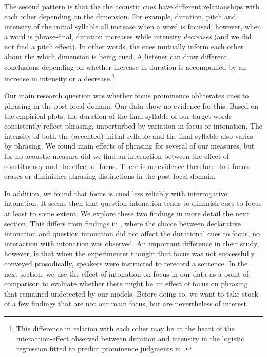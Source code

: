 \documentclass[preprint,review,12pt,authoryear,times]{elsarticle}
\begin{document}
The second pattern is that the the acoustic cues have different relationships with each other depending on the dimension. For example, duration, pitch and intensity of the initial syllable all increase when a word is focused; however, when a word  is phrase-final, duration increases while intensity {\em decreases} (and we did not find a pitch effect). In other words, the cues mutually inform each other about the which dimension is being cued. A listener can draw different conclusions depending on whether increase in duration is accompanied by an increase in intensity or a decrease.\footnote{This difference in relation with each other may be at the heart of the interaction-effect observed between duration and intensity in the logistic regression fitted to predict prominence judgments in \citet{bisho19}.}

Our main research question was whether focus prominence obliterates cues to phrasing in the post-focal domain. Our data show no evidence for this. Based on the empirical plots, the duration of the final syllable of our target words consistently reflect phrasing, unperturbed by variation in focus or intonation. The intensity of both the (accented) initial syllable and the final syllable also varies by phrasing. We found main effects of phrasing for several of our measures, but for no acoustic measure did we find an interaction between the effect of constituency and the effect of focus. There is no evidence therefore that focus erases or diminishes phrasing distinctions in the post-focal domain. 

In addition, we found that focus is cued less reliably with interrogative intonation. It seems then that question intonation tends to diminish cues to focus at least to some extent.  We explore these two findings in more detail the next section. This differs from findings in \citet{eady86}, where the choice between declarative intonation and question intonation did not affect the durational cues to focus, no interaction with intonation was observed. An important difference in their study, however, is that when the experimenter thought that focus was not successfully conveyed prosodically, speakers were instructed to rerecord a sentence. In the next section, we use the effect of intonation on focus in our data as a point of comparison to evaluate whether there might be an effect of focus on phrasing that remained undetected by our models. Before doing so,  we want to take stock of a few findings that are not our main focus, but are nevertheless of interest. 
\end{document}
